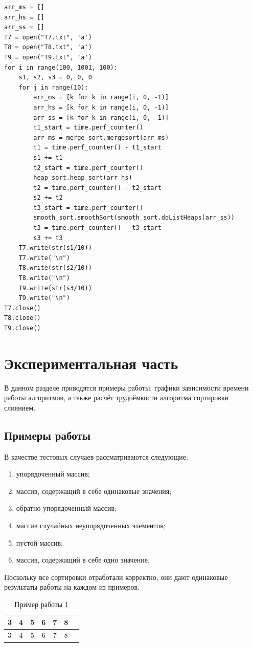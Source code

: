 \documentclass[12pt,a4paper]{scrartcl}
\begin{document}
\begin{verbatim}
arr_ms = []
arr_hs = []
arr_ss = []
T7 = open("T7.txt", 'a')
T8 = open("T8.txt", 'a')
T9 = open("T9.txt", 'a')
for i in range(100, 1001, 100):
    s1, s2, s3 = 0, 0, 0
    for j in range(10):
        arr_ms = [k for k in range(i, 0, -1)]
        arr_hs = [k for k in range(i, 0, -1)]
        arr_ss = [k for k in range(i, 0, -1)]
        t1_start = time.perf_counter()
        arr_ms = merge_sort.mergesort(arr_ms)
        t1 = time.perf_counter() - t1_start
        s1 += t1
        t2_start = time.perf_counter()
        heap_sort.heap_sort(arr_hs)
        t2 = time.perf_counter() - t2_start
        s2 += t2
        t3_start = time.perf_counter()
        smooth_sort.smoothSort(smooth_sort.doListHeaps(arr_ss))
        t3 = time.perf_counter() - t3_start
        s3 += t3
    T7.write(str(s1/10))
    T7.write("\n")
    T8.write(str(s2/10))
    T8.write("\n")
    T9.write(str(s3/10))
    T9.write("\n")
T7.close()
T8.close()
T9.close()
\end{verbatim}

\newpage
\section{Экспериментальная часть}

В данном разделе приводятся примеры работы, графики зависимости времени работы алгоритмов, а также расчёт трудоёмкости алгоритма сортировки слиянием.

\subsection{Примеры работы}

В качестве тестовых случаев рассматриваются следующие:\\
\begin{enumerate}
	\item упорядоченный массив;
	\item массив, содержащий в себе одинаковые значения;
	\item обратно упорядоченный массив;
	\item массив случайных неупорядоченных элементов;
	\item пустой массив;
	\item массив, содержащий в себе одно значение.
\end{enumerate}

Поскольку все сортировки отработали корректно, они дают одинаковые результаты работы на каждом из примеров.

\begin{table}[ht]
	\caption{Пример работы 1}
	\begin{tabular}{|l|c|c|c|c|c|c|}
		\hline
		3 & 4 & 5 & 6 & 7 & 8\\
		\hline
		\hline
		3 & 4 & 5 & 6 & 7 & 8\\
		\hline
	\end{tabular}
	\label{tab:tabular}
\end{table}
\end{document}
